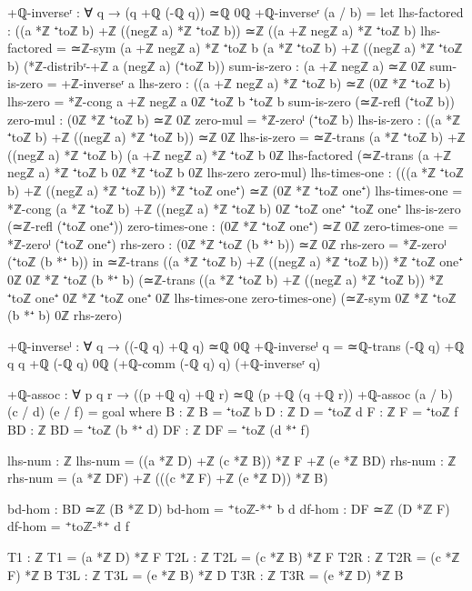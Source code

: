 \documentclass[11pt,a4paper]{book}
\begin{document}
\begin{code}
+ℚ-inverseʳ : ∀ q → (q +ℚ (-ℚ q)) ≃ℚ 0ℚ
+ℚ-inverseʳ (a / b) = 
  let 
      lhs-factored : ((a *ℤ ⁺toℤ b) +ℤ ((negℤ a) *ℤ ⁺toℤ b)) ≃ℤ ((a +ℤ negℤ a) *ℤ ⁺toℤ b)
      lhs-factored = ≃ℤ-sym {(a +ℤ negℤ a) *ℤ ⁺toℤ b} {(a *ℤ ⁺toℤ b) +ℤ ((negℤ a) *ℤ ⁺toℤ b)} 
                           (*ℤ-distribʳ-+ℤ a (negℤ a) (⁺toℤ b))
      sum-is-zero : (a +ℤ negℤ a) ≃ℤ 0ℤ
      sum-is-zero = +ℤ-inverseʳ a
      lhs-zero : ((a +ℤ negℤ a) *ℤ ⁺toℤ b) ≃ℤ (0ℤ *ℤ ⁺toℤ b)
      lhs-zero = *ℤ-cong {a +ℤ negℤ a} {0ℤ} {⁺toℤ b} {⁺toℤ b} sum-is-zero (≃ℤ-refl (⁺toℤ b))
      zero-mul : (0ℤ *ℤ ⁺toℤ b) ≃ℤ 0ℤ
      zero-mul = *ℤ-zeroˡ (⁺toℤ b)
      lhs-is-zero : ((a *ℤ ⁺toℤ b) +ℤ ((negℤ a) *ℤ ⁺toℤ b)) ≃ℤ 0ℤ
      lhs-is-zero = ≃ℤ-trans {(a *ℤ ⁺toℤ b) +ℤ ((negℤ a) *ℤ ⁺toℤ b)} {(a +ℤ negℤ a) *ℤ ⁺toℤ b} {0ℤ}
                            lhs-factored 
                            (≃ℤ-trans {(a +ℤ negℤ a) *ℤ ⁺toℤ b} {0ℤ *ℤ ⁺toℤ b} {0ℤ} lhs-zero zero-mul)
      lhs-times-one : (((a *ℤ ⁺toℤ b) +ℤ ((negℤ a) *ℤ ⁺toℤ b)) *ℤ ⁺toℤ one⁺) ≃ℤ (0ℤ *ℤ ⁺toℤ one⁺)
      lhs-times-one = *ℤ-cong {(a *ℤ ⁺toℤ b) +ℤ ((negℤ a) *ℤ ⁺toℤ b)} {0ℤ} {⁺toℤ one⁺} {⁺toℤ one⁺}
                             lhs-is-zero (≃ℤ-refl (⁺toℤ one⁺))
      zero-times-one : (0ℤ *ℤ ⁺toℤ one⁺) ≃ℤ 0ℤ
      zero-times-one = *ℤ-zeroˡ (⁺toℤ one⁺)
      rhs-zero : (0ℤ *ℤ ⁺toℤ (b *⁺ b)) ≃ℤ 0ℤ
      rhs-zero = *ℤ-zeroˡ (⁺toℤ (b *⁺ b))
  in ≃ℤ-trans {((a *ℤ ⁺toℤ b) +ℤ ((negℤ a) *ℤ ⁺toℤ b)) *ℤ ⁺toℤ one⁺} {0ℤ} {0ℤ *ℤ ⁺toℤ (b *⁺ b)}
             (≃ℤ-trans {((a *ℤ ⁺toℤ b) +ℤ ((negℤ a) *ℤ ⁺toℤ b)) *ℤ ⁺toℤ one⁺} {0ℤ *ℤ ⁺toℤ one⁺} {0ℤ}
                       lhs-times-one zero-times-one)
             (≃ℤ-sym {0ℤ *ℤ ⁺toℤ (b *⁺ b)} {0ℤ} rhs-zero)

+ℚ-inverseˡ : ∀ q → ((-ℚ q) +ℚ q) ≃ℚ 0ℚ
+ℚ-inverseˡ q = ≃ℚ-trans {(-ℚ q) +ℚ q} {q +ℚ (-ℚ q)} {0ℚ} (+ℚ-comm (-ℚ q) q) (+ℚ-inverseʳ q)

+ℚ-assoc : ∀ p q r → ((p +ℚ q) +ℚ r) ≃ℚ (p +ℚ (q +ℚ r))
+ℚ-assoc (a / b) (c / d) (e / f) = goal
  where
    B : ℤ
    B = ⁺toℤ b
    D : ℤ
    D = ⁺toℤ d
    F : ℤ
    F = ⁺toℤ f
    BD : ℤ
    BD = ⁺toℤ (b *⁺ d)
    DF : ℤ
    DF = ⁺toℤ (d *⁺ f)
    
    lhs-num : ℤ
    lhs-num = ((a *ℤ D) +ℤ (c *ℤ B)) *ℤ F +ℤ (e *ℤ BD)
    rhs-num : ℤ
    rhs-num = (a *ℤ DF) +ℤ (((c *ℤ F) +ℤ (e *ℤ D)) *ℤ B)

    bd-hom : BD ≃ℤ (B *ℤ D)
    bd-hom = ⁺toℤ-*⁺ b d
    df-hom : DF ≃ℤ (D *ℤ F)
    df-hom = ⁺toℤ-*⁺ d f

    T1 : ℤ
    T1 = (a *ℤ D) *ℤ F
    T2L : ℤ
    T2L = (c *ℤ B) *ℤ F
    T2R : ℤ
    T2R = (c *ℤ F) *ℤ B
    T3L : ℤ
    T3L = (e *ℤ B) *ℤ D
    T3R : ℤ
    T3R = (e *ℤ D) *ℤ B


\end{code}
\end{document}
